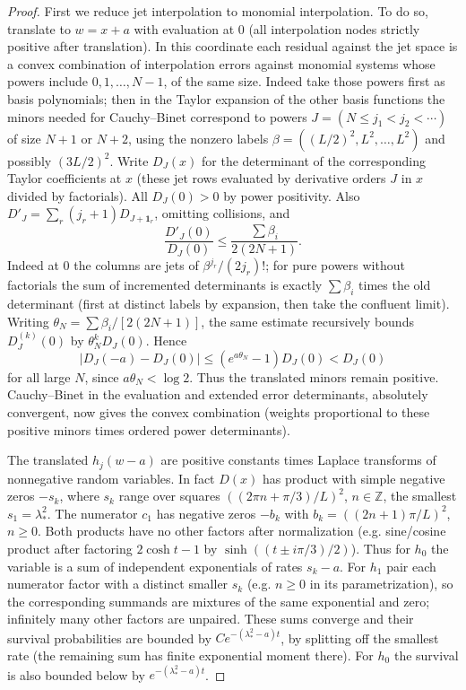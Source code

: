\begin{proof}
First we reduce jet interpolation to monomial interpolation. To do so, translate to $w=x+a$ with evaluation at 0 (all interpolation nodes strictly positive after translation). In this coordinate each residual against the jet space is a convex combination of interpolation errors against monomial systems whose powers include $0,1,\ldots,N-1$, of the same size. Indeed take those powers first as basis polynomials; then in the Taylor expansion of the other basis functions the minors needed for Cauchy--Binet correspond to powers $J=(N\le j_1<j_2<\cdots)$ of size $N+1$ or $N+2$, using the nonzero labels $\beta=((L/2)^2,L^2,\ldots,L^2)$ and possibly $(3L/2)^2$. Write $D_J(x)$ for the determinant of the corresponding Taylor coefficients at $x$ (these jet rows evaluated by derivative orders $J$ in $x$ divided by factorials). All $D_J(0)>0$ by power positivity. Also $D'_J=\sum_r(j_r+1)D_{J+\mathbf 1_r}$, omitting collisions, and
\[
 \frac{D'_J(0)}{D_J(0)}\le\frac{\sum \beta_i}{2(2N+1)}.
\]
Indeed at 0 the columns are jets of $\beta^{j_r}/(2j_r)!$; for pure powers without factorials the sum of incremented determinants is exactly $\sum\beta_i$ times the old determinant (first at distinct labels by expansion, then take the confluent limit). Writing $\theta_N=\sum\beta_i/[2(2N+1)]$, the same estimate recursively bounds $D_J^{(k)}(0)$ by $\theta_N^kD_J(0)$. Hence
\[
 |D_J(-a)-D_J(0)|\le(e^{a\theta_N}-1)D_J(0)<D_J(0)
\]
for all large $N$, since $a\theta_N<\log2$. Thus the translated minors remain positive. Cauchy--Binet in the evaluation and extended error determinants, absolutely convergent, now gives the convex combination (weights proportional to these positive minors times ordered power determinants).

The translated $h_j(w-a)$ are positive constants times Laplace transforms of nonnegative random variables. In fact $D(x)$ has product with simple negative zeros $-s_k$, where $s_k$ range over squares $((2\pi n+\pi/3)/L)^2$, $n\in\mathbb Z$, the smallest $s_1=\lambda_*^2$. The numerator $c_1$ has negative zeros $-b_k$ with $b_k=((2n+1)\pi/L)^2$, $n\ge0$. Both products have no other factors after normalization (e.g. sine/cosine product after factoring $2\cosh t-1$ by $\sinh((t\pm i\pi/3)/2)$). Thus for $h_0$ the variable is a sum of independent exponentials of rates $s_k-a$. For $h_1$ pair each numerator factor with a distinct smaller $s_k$ (e.g. $n\ge0$ in its parametrization), so the corresponding summands are mixtures of the same exponential and zero; infinitely many other factors are unpaired. These sums converge and their survival probabilities are bounded by $C e^{-(\lambda_*^2-a)t}$, by splitting off the smallest rate (the remaining sum has finite exponential moment there). For $h_0$ the survival is also bounded below by $e^{-(\lambda_*^2-a)t}$.


\end{proof}

